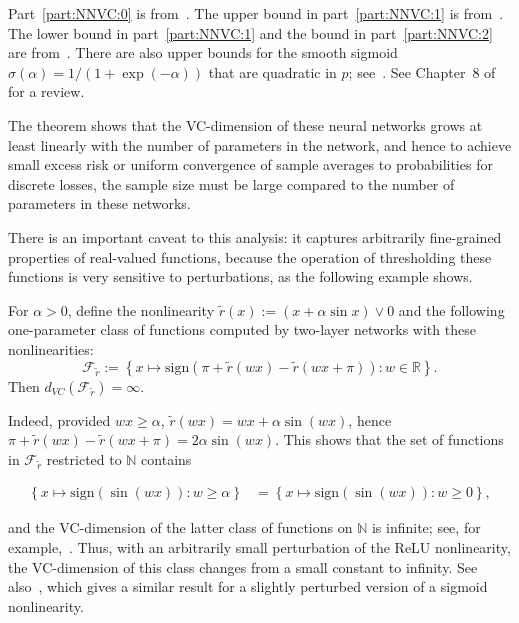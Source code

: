 Part~\ref{part:NNVC:0} is from~\cite{bh-wsngvg-89}.  The upper bound in part~\ref{part:NNVC:1} is from~\cite{bhlm-ntvcdpdbfplnn-19}. The lower bound in part~\ref{part:NNVC:1} and the bound in part~\ref{part:NNVC:2}
are from~\cite{bmm-alvdbppn-98}.  There are also upper bounds for the smooth sigmoid $\sigma(\alpha)=1/(1+\exp(-\alpha))$ that are quadratic in $p$; see~\cite{km-pbvdsgpnn-97}. See Chapter~8 of~\cite{ab-nnltf-99} for a review.

The theorem shows that the VC-dimension of these neural networks grows at least linearly with the number of parameters in the network, and hence to achieve small excess risk or uniform convergence of sample averages to probabilities for discrete losses, the sample size must be large compared to the number of parameters in these networks.

There is an important caveat to this analysis: it captures arbitrarily fine-grained properties of real-valued functions, because the operation of thresholding these functions is very sensitive to perturbations, as the following example shows.

\begin{example}
  For $\alpha>0$, define the nonlinearity $\tilde r(x):=(x+\alpha\sin
  x)\vee 0$ and the following one-parameter class of functions computed by two-layer networks with these nonlinearities:
    \[
      {\mathcal F}_{\tilde r} := \left\{ x\mapsto \mathrm{sign}(\pi + \tilde r(wx) -
      \tilde r(wx+\pi)):
        w\in{\mathbb R}\right\}.
    \]
  Then $d_{VC}({\mathcal F}_{\tilde r})=\infty$.
\end{example}

Indeed, provided $wx\ge\alpha$, $\tilde r(wx)=wx+\alpha\sin(wx)$, hence $\pi +
\tilde r(wx) - \tilde r(wx+\pi)=2\alpha\sin(wx)$. This shows that the set of functions in ${\mathcal F}_{\tilde r}$ restricted to $\mathbb{N}$ contains

\begin{align*}
      \left\{ x\mapsto\mathrm{sign}(\sin(wx)):w\ge \alpha\right\}

      & =
      \left\{ x\mapsto\mathrm{sign}(\sin(wx)) :w\ge 0\right\},
    \end{align*}

and the VC-dimension of the latter class of functions on $\mathbb{N}$
is infinite; see, for example,~\cite[Lemma~7.2]{ab-nnltf-99}.  Thus, with an arbitrarily small perturbation of the ReLU nonlinearity, the VC-dimension of this class changes from a small constant to infinity. See also~\cite[Theorem~7.1]{ab-nnltf-99}, which gives a similar result for a slightly perturbed version of a sigmoid nonlinearity.

